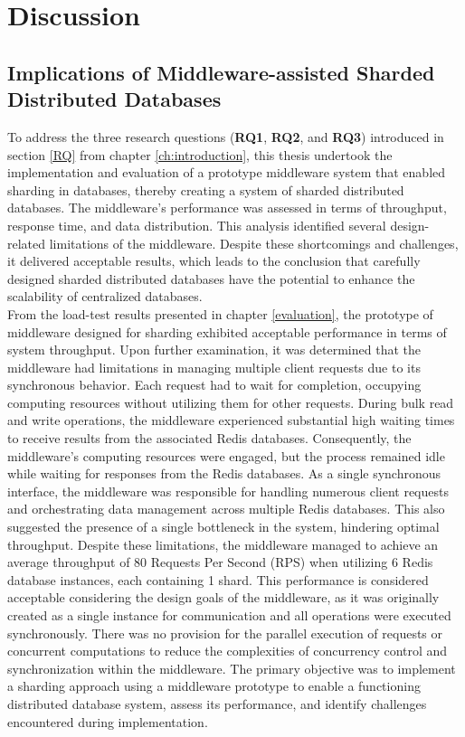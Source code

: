 
\chapter{Discussion}\label{ch:discussion} %
\section{Implications of Middleware-assisted Sharded Distributed Databases}
To address the three research questions (\textbf{RQ1}, \textbf{RQ2}, and \textbf{RQ3}) introduced in section \ref{RQ} from chapter \ref{ch:introduction}, this thesis undertook the implementation and evaluation of a prototype middleware system that enabled sharding in databases, thereby creating a system of sharded distributed databases. The middleware's performance was assessed in terms of throughput, response time, and data distribution. This analysis identified several design-related limitations of the middleware. Despite these shortcomings and challenges, it delivered acceptable results, which leads to the conclusion that carefully designed sharded distributed databases have the potential to enhance the scalability of centralized databases. \\

\noindent From the load-test results presented in chapter \ref{evaluation}, the prototype of middleware designed for sharding exhibited acceptable performance in terms of system throughput. Upon further examination, it was determined that the middleware had limitations in managing multiple client requests due to its synchronous behavior. Each request had to wait for completion, occupying computing resources without utilizing them for other requests. During bulk read and write operations, the middleware experienced substantial high waiting times to receive results from the associated Redis databases. Consequently, the middleware's computing resources were engaged, but the process remained idle while waiting for responses from the Redis databases. As a single synchronous interface, the middleware was responsible for handling numerous client requests and orchestrating data management across multiple Redis databases. This also suggested the presence of a single bottleneck in the system, hindering optimal throughput. Despite these limitations, the middleware managed to achieve an average throughput of 80 Requests Per Second (RPS) when utilizing 6 Redis database instances, each containing 1 shard. This performance is considered acceptable considering the design goals of the middleware, as it was originally created as a single instance for communication and all operations were executed synchronously. There was no provision for the parallel execution of requests or concurrent computations to reduce the complexities of concurrency control and synchronization within the middleware. The primary objective was to implement a sharding approach using a middleware prototype to enable a functioning distributed database system, assess its performance, and identify challenges encountered during implementation. \\

